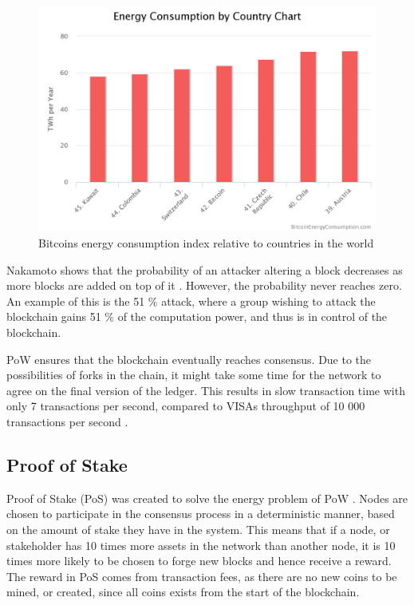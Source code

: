 \begin{figure}[ht]
    \centering
    \includegraphics[width=1\textwidth]{Images/bitcoin_energy}
    \caption{Bitcoins energy consumption index relative to countries in the world \cite{bitcoin_energy}}
    \label{fig:bitcoin_energy}
\end{figure}


Nakamoto shows that the probability of an attacker altering a block decreases as more blocks are added on top of it \cite{Nakamoto_bitcoin}. However, the probability never reaches zero. An example of this is the 51 \% attack, where a group wishing to attack the blockchain gains 51 \% of the computation power, and thus is in control of the blockchain. 

PoW ensures that the blockchain eventually reaches consensus. Due to the possibilities of forks in the chain, it might take some time for the network to agree on the final version of the ledger. This results in slow transaction time with only 7 transactions per second, compared to VISAs throughput of 10 000 transactions per second \cite{understanding_consensus}. 

\subsection{Proof of Stake}
Proof of Stake (PoS) was created to solve the energy problem of PoW \cite{understanding_consensus, Zheng_overview}. Nodes are chosen to participate in the consensus process in a deterministic manner, based on the amount of stake they have in the system. This means that if a node, or stakeholder has 10 times more assets in the network than another node, it is 10 times more likely \cite{ethereum_wiki} to be chosen to forge new blocks and hence receive a reward. The reward in PoS comes from transaction fees, as there are no new coins to be mined, or created, since all coins exists from the start of the blockchain. 

